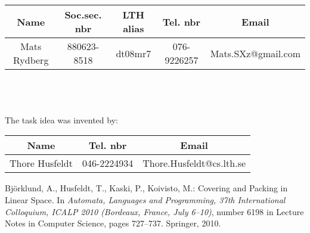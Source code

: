 \documentclass[a4paper, titlepage]{article}
\begin{document}
\begin{tabular}{c|c|c|c|c}
Name & Soc.sec. nbr & LTH alias & Tel. nbr & Email \\ \hline
Mats Rydberg & 880623-8518 & dt08mr7 & 076-9226257 & Mats.SXz@gmail.com \\
\end{tabular}
\\ \\ \\ 
The task idea was invented by:
\\

\begin{tabular}{c|c|c}
Name & Tel. nbr & Email \\ \hline
Thore Husfeldt & 046-2224934  & Thore.Husfeldt@cs.lth.se \\
\end{tabular}

\begin{thebibliography}{99}
 Björklund, A., Husfeldt, T., Kaski, P., Koivisto, M.: Covering and Packing in Linear Space. In \emph{Automata, Languages and Programming, 37th International Colloquium, ICALP 2010 (Bordeaux, France, July 6–10)}, number 6198 in Lecture Notes in Computer Science, pages 727–737. Springer, 2010.
\end{thebibliography}
\end{document}

